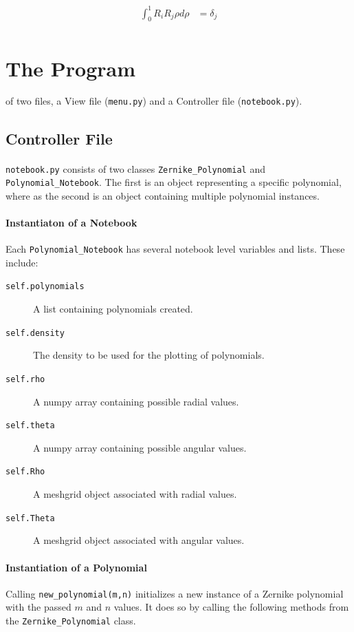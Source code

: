 \documentclass{tufte-handout}
\begin{document}
\begin{align*}
\int_0^1R_iR_j\rho d\rho &= \delta_j\\
\end{align*}

\pagebreak

\section{The Program}\label{sec:program}

 of two files, a View file (\Verb|menu.py|) and a Controller file (\Verb|notebook.py|).


\subsection{Controller File}
\paragraph{}\Verb|notebook.py| consists of two classes \Verb|Zernike_Polynomial| and \Verb|Polynomial_Notebook|.  The first is an object representing a specific polynomial, where as the second is an object containing multiple polynomial instances.

\paragraph{Instantiaton of a Notebook}
Each \Verb|Polynomial_Notebook| has several notebook level variables and lists. These include:

\begin{description}
\item[\Verb|self.polynomials|] A list containing polynomials created.
\item[\Verb|self.density|] The density to be used for the plotting of polynomials.
\item[\Verb|self.rho|] A numpy array containing possible radial values.
\item[\Verb|self.theta|] A numpy array containing possible angular values.
\item[\Verb|self.Rho|] A meshgrid object associated with radial values.
\item[\Verb|self.Theta|] A meshgrid object associated with angular values. 
\end{description}

\paragraph{Instantiation of a Polynomial}
Calling \Verb|new_polynomial(m,n)| initializes a new instance of a Zernike polynomial with the passed $m$ and $n$ values.  It does so by calling the following methods from the \Verb|Zernike_Polynomial| class.
\end{document}
